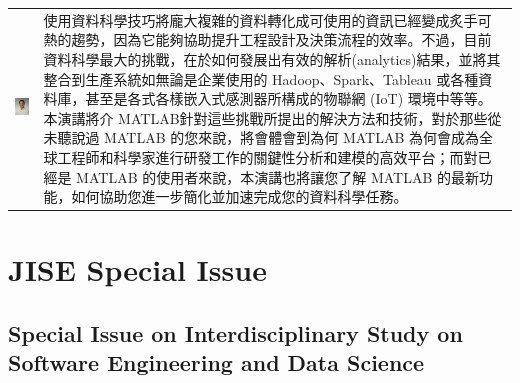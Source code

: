 \documentclass[12pt,oneside,a4paper]{book}
\begin{document}
\begin{tabular}{l m{12cm}}
	\begin{minipage}{4.5cm}
		\includegraphics[width=4.2cm]{images/YiWang.jpg}    
    \end{minipage}
	&
	使用資料科學技巧將龐大複雜的資料轉化成可使用的資訊已經變成炙手可熱的趨勢，因為它能夠協助提升工程設計及決策流程的效率。不過，目前資料科學最大的挑戰，在於如何發展出有效的解析(analytics)結果，並將其整合到生產系統如無論是企業使用的 Hadoop、Spark、Tableau 或各種資料庫，甚至是各式各樣嵌入式感測器所構成的物聯網 (IoT) 環境中等等。本演講將介 MATLAB針對這些挑戰所提出的解決方法和技術，對於那些從未聽說過 MATLAB 的您來說，將會體會到為何 MATLAB 為何會成為全球工程師和科學家進行研發工作的關鍵性分析和建模的高效平台；而對已經是 MATLAB 的使用者來說，本演講也將讓您了解 MATLAB 的最新功能，如何協助您進一步簡化並加速完成您的資料科學任務。
	

\end{tabular}


\chapter*{JISE Special Issue}
%

\section*{Special Issue on Interdisciplinary Study on 
Software Engineering and Data Science}
\end{document}
